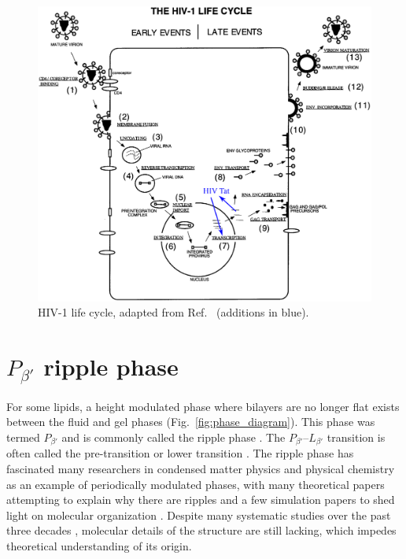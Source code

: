 \begin{figure}[htbp]
  \centering
  \includegraphics[width=\textwidth]{figures/HIV_lifecycle}
  \caption{HIV-1 life cycle, adapted from Ref.~\cite{Freed98}
  (additions in blue).}
  \label{fig:HIV_lifecycle}
\end{figure}

\section{$P_{\beta'}$ ripple phase}
For some lipids, a height modulated phase where
bilayers are no longer flat exists between the fluid and gel phases
(Fig.~\ref{fig:phase_diagram}). 
This phase was termed $P_{\beta'}$ 
and is commonly called the ripple phase \cite{ref:Tardieu73}. 
The $P_{\beta'}$--$L_{\beta'}$ transition is often
called the pre-transition \cite{ref:Wack89} or lower transition \cite{Nagle00}.
The ripple phase has fascinated many researchers in condensed matter physics
and physical chemistry as an example of periodically modulated phases,
with many theoretical papers attempting to explain why there are 
ripples 
\cite{ref:Doniach79,ref:Marder84,ref:Hawton86,ref:Carlson87,ref:Goldstein88,ref:McCullough90,ref:Honda91,ref:Lubensky93,ref:Sengupta01,ref:Kamal11}
and a few simulation papers to shed light on molecular organization 
\cite{ref:deVries05,ref:Lenz07,ref:Scott84,ref:Debnath09}.
Despite many systematic studies over the past three decades
\cite{ref:Tardieu73,ref:Janiak76,ref:Copeland80,ref:Ruppel83,ref:Zasadzinski87,ref:Wack89,ref:Sun96,ref:Katsaras00,ref:Sengupta03}, 
molecular details of the structure are still lacking, which impedes
theoretical understanding of its origin.

